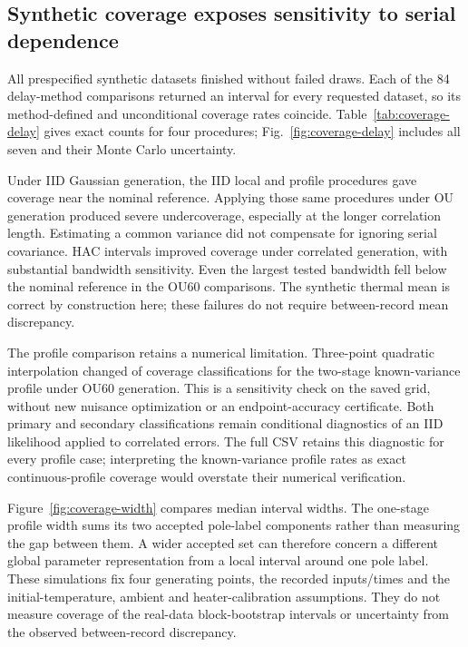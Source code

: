 \subsection{Synthetic coverage exposes sensitivity to serial dependence}

All \CoverageTotalDatasets{} prespecified synthetic datasets finished without
failed draws. Each of the 84 delay-method comparisons returned an interval for
every requested dataset, so its method-defined and unconditional coverage rates
coincide. Table~\ref{tab:coverage-delay} gives exact counts for four procedures;
Fig.~\ref{fig:coverage-delay} includes all seven and their Monte Carlo uncertainty.

Under IID Gaussian generation, the IID local and profile procedures gave
coverage near the nominal reference. Applying those same procedures under OU
generation produced severe undercoverage, especially at the longer correlation
length. Estimating a common variance did not compensate for ignoring serial
covariance. HAC intervals improved coverage under correlated generation, with
substantial bandwidth sensitivity. Even the largest tested bandwidth fell below
the nominal reference in the OU60 comparisons. The synthetic thermal mean is
correct by construction here; these failures do not require between-record
mean discrepancy.


The profile comparison retains a numerical limitation. Three-point quadratic
interpolation changed \CoverageTwoStageOUKnownGridChanges{} of
\CoverageReplicates{} coverage classifications for the two-stage known-variance
profile under OU60 generation. This is a sensitivity check on the saved grid,
without new nuisance optimization or an endpoint-accuracy certificate. Both
primary and secondary classifications remain conditional diagnostics of an IID
likelihood applied to correlated errors. The full CSV retains this diagnostic
for every profile case; interpreting the known-variance profile rates as exact
continuous-profile coverage would overstate their numerical verification.

Figure~\ref{fig:coverage-width} compares median interval widths. The one-stage
profile width sums its two accepted pole-label components rather than measuring
the gap between them. A wider accepted set can therefore concern a different
global parameter representation from a local interval around one pole label.
These simulations fix four generating points, the recorded inputs/times and the
initial-temperature, ambient and heater-calibration assumptions. They do not
measure coverage of the real-data block-bootstrap intervals or uncertainty from
the observed between-record discrepancy.

